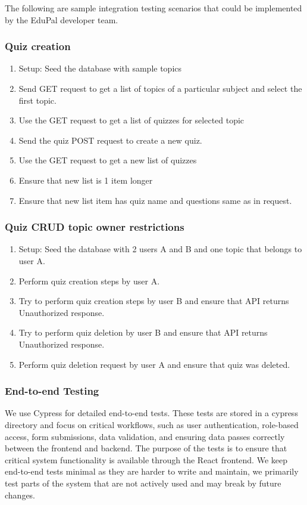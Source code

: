 The following are sample integration testing scenarios that could be implemented by the EduPal developer team.

\subsubsection{Quiz creation}

\begin{enumerate}
  \item Setup: Seed the database with sample topics
  \item Send GET request to get a list of topics of a particular subject and select the first topic.
  \item Use the GET request to get a list of quizzes for selected topic
  \item Send the quiz POST request to create a new quiz.
  \item Use the GET request to get a new list of quizzes
  \item Ensure that new list is 1 item longer
  \item Ensure that new list item has quiz name and questions same as in request.
\end{enumerate}

\subsubsection{Quiz CRUD topic owner restrictions}

\begin{enumerate}
  \item Setup: Seed the database with 2 users A and B and one topic that belongs to user A.
  \item Perform quiz creation steps by user A.
  \item Try to perform quiz creation steps by user B and ensure that API returns Unauthorized response.
  \item Try to perform quiz deletion by user B and ensure that API returns Unauthorized response.
  \item Perform quiz deletion request by user A and ensure that quiz was deleted.
\end{enumerate}

\subsubsection{End-to-end Testing}

We use Cypress for detailed end-to-end tests. These tests are stored in a cypress directory and focus on critical workflows, such as user authentication, role-based access, form submissions, data validation, and ensuring data passes correctly between the frontend and backend. The purpose of the tests is to ensure that critical system functionality is available through the React frontend. We keep end-to-end tests minimal as they are harder to write and maintain, we primarily test parts of the system that are not actively used and may break by future changes.

